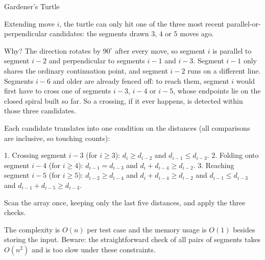 \begin{tutorial}{Gardener's Turtle}

Extending move $i$, the turtle can only hit one of the three most recent parallel-or-perpendicular candidates: the segments drawn $3$, $4$ or $5$ moves ago.

Why? The direction rotates by $90^\circ$ after every move, so segment $i$ is parallel to segment $i - 2$ and perpendicular to segments $i - 1$ and $i - 3$. Segment $i - 1$ only shares the ordinary continuation point, and segment $i - 2$ runs on a different line. Segments $i - 6$ and older are already fenced off: to reach them, segment $i$ would first have to cross one of segments $i - 3$, $i - 4$ or $i - 5$, whose endpoints lie on the closed spiral built so far. So a crossing, if it ever happens, is detected within those three candidates.

Each candidate translates into one condition on the distances (all comparisons are inclusive, so touching counts):

1. Crossing segment $i - 3$ (for $i \ge 3$): $d_i \ge d_{i - 2}$ and $d_{i - 1} \le d_{i - 3}$.
2. Folding onto segment $i - 4$ (for $i \ge 4$): $d_{i - 1} = d_{i - 3}$ and $d_i + d_{i - 4} \ge d_{i - 2}$.
3. Reaching segment $i - 5$ (for $i \ge 5$): $d_{i - 2} \ge d_{i - 4}$ and $d_i + d_{i - 4} \ge d_{i - 2}$ and $d_{i - 1} \le d_{i - 3}$ and $d_{i - 1} + d_{i - 5} \ge d_{i - 3}$.

Scan the array once, keeping only the last five distances, and apply the three checks.

The complexity is $O(n)$ per test case and the memory usage is $O(1)$ besides storing the input. Beware: the straightforward check of all pairs of segments takes $O(n^2)$ and is too slow under these constraints.


\end{tutorial}
